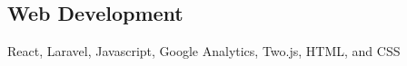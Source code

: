 \documentclass[../Resume.tex]{subfiles}
\begin{document}
    \subsection{Web Development}
    React, Laravel, Javascript, Google Analytics, Two.js, HTML, and CSS
    \vspace*{-4mm}
\end{document}
